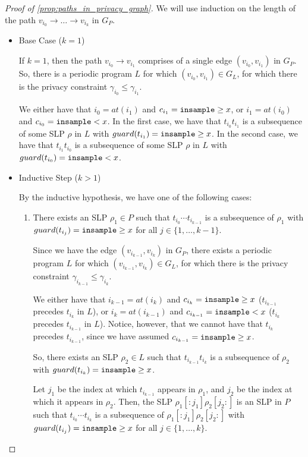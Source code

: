 \begin{proof}[Proof of \ref{prop:paths_in_privacy_graph}]
    We will use induction on the length of the path $v_{i_0} \to \dots \to v_{i_k}$ in $G_P$. 

    \begin{itemize}
        \item Base Case ($k = 1$)
        
        If $k = 1$, then the path $v_{i_0} \to v_{i_1}$ comprises of a single edge $(v_{i_0}, v_{i_1})$ in $G_P$. So, there is a periodic program $L$ for which $(v_{i_0}, v_{i_1}) \in G_L$, for which there is the privacy constraint $\gamma_{i_0} \leq \gamma_{i_1}$. 
        
        We either have that $i_0 = at(i_1)$ and $c_{i_1} = \texttt{insample}\geq x$, or $i_1 = at(i_0)$ and $c_{i_0} = \texttt{insample} < x$. In the first case, we have that $t_{i_0} t_{i_1}$ is a subsequence of some SLP $\rho$ in $L$ with $guard(t_{i_1}) = \texttt{insample}\geq x$. In the second case, we have that $t_{i_1} t_{i_0}$ is a subsequence of some SLP $\rho$ in $L$ with $guard(t_{i_0}) = \texttt{insample} < x$.

        \item Inductive Step ($k > 1$)
        
        By the inductive hypothesis, we have one of the following cases: 

        \begin{enumerate}
            \item There exists an SLP $\rho_1 \in P$ such that $t_{i_0} \cdots t_{i_{k - 1}}$ is a subsequence of $\rho_1$ with $guard(t_{i_j}) = \texttt{insample}\geq x$ for all $j \in \{1, \dots, k - 1\}$.
            
            Since we have the edge $(v_{i_{k - 1}}, v_{i_k})$ in $G_P$, there exists a periodic program $L$ for which $(v_{i_{k - 1}}, v_{i_k}) \in G_L$, for which there is the privacy constraint $\gamma_{i_{k - 1}} \leq \gamma_{i_k}$.

            We either have that $i_{k - 1} = at(i_k)$ and $c_{i_k} = \texttt{insample}\geq x$ ($t_{i_{k - 1}}$ precedes $t_{i_k}$ in $L$), or $i_k = at(i_{k - 1})$ and $c_{i_{k - 1}} = \texttt{insample} < x$ ($t_{i_k}$ precedes $t_{i_{k - 1}}$ in $L$). Notice, however, that we cannot have that $t_{i_k}$ precedes $t_{i_{k - 1}}$, since we have assumed $c_{i_{k - 1}} = \texttt{insample}\geq x$. 

            So, there exists an SLP $\rho_2 \in L$ such that $t_{i_{k - 1}} t_{i_k}$ is a subsequence of $\rho_2$ with $guard(t_{i_k}) = \texttt{insample}\geq x$. 

            Let $j_1$ be the index at which $t_{i_{k - 1}}$ appears in $\rho_1$, and $j_2$ be the index at which it appears in $\rho_2$. Then, the SLP $\rho_1[:j_1] \rho_2[j_2:]$ is an SLP in $P$ such that $t_{i_0} \cdots t_{i_k}$ is a subsequence of $\rho_1[:j_1] \rho_2[j_2:]$ with $guard(t_{i_j}) = \texttt{insample}\geq x$ for all $j \in \{1, \dots, k\}$.


\end{enumerate}
\end{itemize}
\end{proof}
